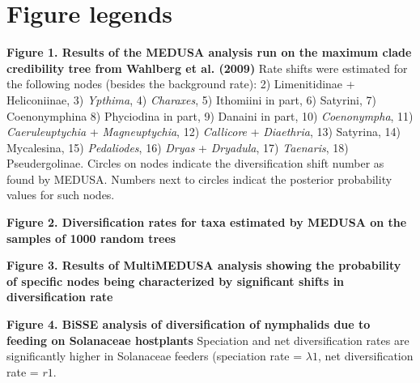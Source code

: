\documentclass[10pt]{article}
\begin{document}
\section*{Figure legends}
\begin{description}
 \item {\bf Figure 1. Results of the MEDUSA analysis run on the maximum
clade credibility tree from Wahlberg et al. (2009)} Rate shifts were estimated for the
following nodes (besides the background rate): 2) Limenitidinae +
Heliconiinae, 3) \emph{Ypthima}, 4) \emph{Charaxes}, 5) Ithomiini in
part, 6) Satyrini, 7) Coenonymphina 8) Phyciodina in part, 9) Danaini in
part, 10) \emph{Coenonympha}, 11) \emph{Caeruleuptychia} +
\emph{Magneuptychia}, 12) \emph{Callicore} + \emph{Diaethria}, 13)
Satyrina, 14) Mycalesina, 15) \emph{Pedaliodes}, 16) \emph{Dryas} +
\emph{Dryadula}, 17) \emph{Taenaris}, 18) Pseudergolinae. Circles on
nodes indicate the diversification shift number as found by MEDUSA.
Numbers next to circles indicat the posterior probability values for
such nodes.

\item {\bf Figure 2. Diversification rates for taxa estimated by MEDUSA on
the samples of 1000 random trees}

\item {\bf Figure 3. Results of MultiMEDUSA analysis showing the
probability of specific nodes being characterized by significant shifts
in diversification rate}

\item {\bf Figure 4. BiSSE analysis of diversification of nymphalids due
to feeding on Solanaceae hostplants} Speciation and net diversification
rates are significantly higher in Solanaceae feeders (speciation rate =
$\lambda1$, net diversification rate = $r1$.
\end{description}
\end{document}
